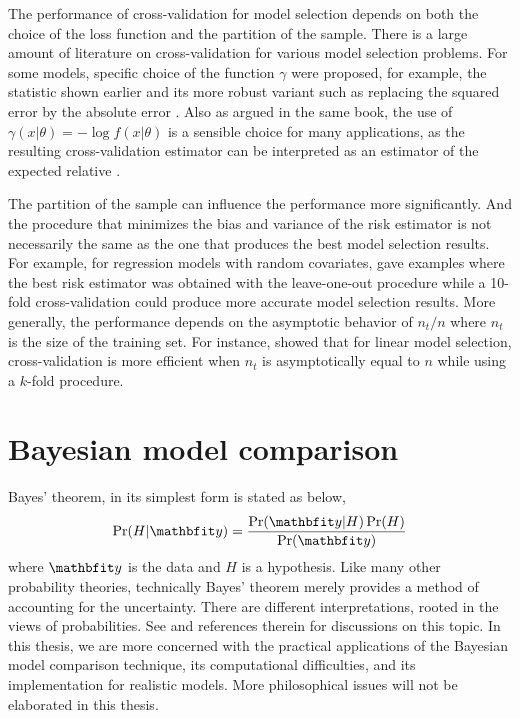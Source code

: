 The performance of cross-validation for model selection depends on both the choice of the loss function and the partition of the sample. There is a large amount of literature on cross-validation for various model selection problems. For some models, specific choice of the function $\gamma$ were proposed, for example, the \press statistic shown earlier and its more robust variant such as replacing the squared error by the absolute error \cite[][sec.~2.9]{Claeskens:2008tq}. Also as argued in the same book, the use of $\gamma(x|\theta) = -\log f(x|\theta)$ is a sensible choice for many applications, as the resulting cross-validation estimator can be interpreted as an estimator of the expected relative \kld.

The partition of the sample can influence the performance more significantly. And the procedure that minimizes the bias and variance of the risk estimator is not necessarily the same as the one that produces the best model selection results. For example, for regression models with random covariates, \cite{Breiman:1992vx} gave examples where the best risk estimator was obtained with the leave-one-out procedure while a 10-fold cross-validation could produce more accurate model selection results. More generally, the performance depends on the asymptotic behavior of $n_t/n$ where $n_t$ is the size of the training set. For instance, \cite{Shao:1997vx} showed that for linear model selection, cross-validation is more efficient when $n_t$ is asymptotically equal to $n$ while using a $k$-fold procedure.

\section{Bayesian model comparison}
\label{sec:Bayesian model comparison}

Bayes' theorem, in its simplest form is stated as below,
\begin{equation}
  \Pr(H|\data) = \frac{\Pr(\data|H)\Pr(H)}{\Pr(\data)} \label{eq:bayes}
\end{equation}
where $\data$ is the data and $H$ is a hypothesis. Like many other probability theories, technically Bayes' theorem merely provides a method of accounting for the uncertainty. There are different interpretations, rooted in the views of probabilities. See \cite[][chap.~1]{Bernardo:1994vd} and references therein for discussions on this topic. In this thesis, we are more concerned with the practical applications of the Bayesian model comparison technique, its computational difficulties, and its implementation for realistic models. More philosophical issues will not be elaborated in this thesis.

